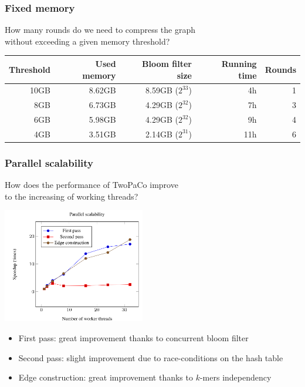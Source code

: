 
\begin{frame}
	\frametitle{Fixed memory}
	\centering
	
	How many rounds do we need to compress the graph\\ without exceeding a given memory threshold?
	
	\bigskip
	
	\begin{tabular}{ | r | r | r | r | r | }
  \hline
  Threshold  & Used memory & Bloom filter size & Running time & Rounds \\ \hline
        10GB &      8.62GB &       8.59GB ($2^{33}$) &           4h &      1 \\
         8GB &      6.73GB &       4.29GB ($2^{32}$) &           7h &      3 \\
         6GB &      5.98GB &       4.29GB ($2^{32}$) &           9h &      4 \\
         4GB &      3.51GB &       2.14GB ($2^{31}$) &          11h &      6 \\
  \hline
  \end{tabular}

\end{frame}


\begin{frame}
	\frametitle{Parallel scalability}
	\centering
	
	How does the performance of TwoPaCo improve \\to the increasing of working threads?
	 
	\includegraphics[height=5cm]{images/scalability}
	
	\begin{itemize}
	  \item First pass: great improvement thanks to concurrent bloom filter
	  \item Second pass: slight improvement due to race-conditions on the hash table
	  \item Edge construction: great improvement thanks to $k$-mers independency
	\end{itemize}
\end{frame}

